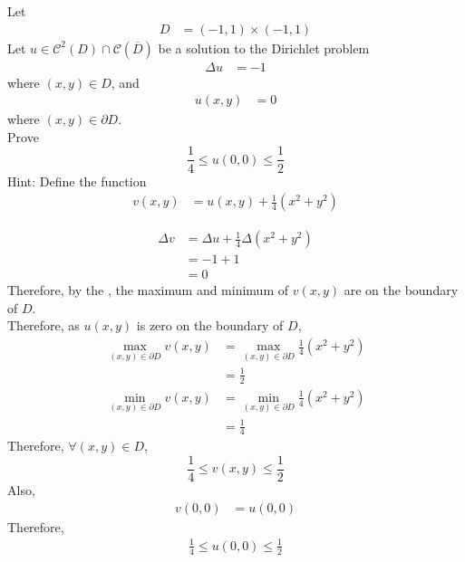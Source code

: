 \documentclass[titlepage, fleqn, a4paper, 12pt, twoside]{article}
\theoremstyle{definition}
\theoremstyle{theorem}
\begin{document}
\begin{question}
	Let
	\begin{align*}
		D & = (-1,1) \times (-1,1)
	\end{align*}
	Let $u \in \mathcal{C}^2(D) \cap \mathcal{C}\left( \overline{D} \right)$ be a solution to the Dirichlet problem
	\begin{align*}
		\Delta u & = -1
	\end{align*}
	where $(x,y) \in D$, and
	\begin{align*}
		u(x,y) & = 0
	\end{align*}
	where $(x,y) \in \partial D$.\\
	Prove
	\begin{equation*}
		\frac{1}{4} \le u(0,0) \le \frac{1}{2}
	\end{equation*}
	Hint: Define the function
	\begin{align*}
		v(x,y) & = u(x,y) + \frac{1}{4} \left( x^2 + y^2 \right)
	\end{align*}
\end{question}

\begin{solution}
	\begin{align*}
		\Delta v & = \Delta u + \frac{1}{4} \Delta\left( x^2 + y^2 \right) \\
                         & = -1 + 1                                                \\
                         & = 0
	\end{align*}
	Therefore, by the , the maximum and minimum of $v(x,y)$ are on the boundary of $D$.\\
	Therefore, as $u(x,y)$ is zero on the boundary of $D$,
	\begin{align*}
		\max\limits_{(x,y) \in \partial D} v(x,y) & = \max\limits_{(x,y) \in \partial D} \frac{1}{4} \left( x^2 + y^2 \right) \\
                                                          & = \frac{1}{2}                                                             \\
		\min\limits_{(x,y) \in \partial D} v(x,y) & = \min\limits_{(x,y) \in \partial D} \frac{1}{4} \left( x^2 + y^2 \right) \\
                                                          & = \frac{1}{4}
	\end{align*}
	Therefore, $\forall (x,y) \in D$,
	\begin{equation*}
		\frac{1}{4} \le v(x,y) \le \frac{1}{2}
	\end{equation*}
	Also,
	\begin{align*}
		v(0,0) & = u(0,0)
	\end{align*}
	Therefore,
	\begin{align*}
		\frac{1}{4} \le u(0,0) \le \frac{1}{2}
	\end{align*}
\end{solution}
\end{document}
